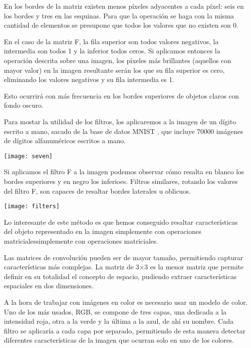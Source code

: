 En los bordes de la matriz existen menos píxeles adyacentes a cada píxel: seis en los bordes y tres en las esquinas. Para que la operación se haga con la misma cantidad de elementos se presupone que todos los valores que no existen son 0.

En el caso de la matriz F, la fila superior son todos valores negativos, la intermedia son todos 1 y la inferior todos ceros. Si aplicamos entonces la operación descrita sobre una imagen, los píxeles más brillantes (aquellos con mayor valor) en la imagen resultante serán los que su fila superior es cero, eliminando los valores negativos y su fila intermedia es 1. 

Esto ocurrirá con más frecuencia en los bordes superiores de objetos claros con fondo oscuro.

Para mostar la utilidad de los filtros, los aplicaremos a la imagen de un dígito escrito a mano, sacado de la base de datos MNIST \parencite{lecun-mnisthandwrittendigit-2010}, que incluye 70000 imágenes de dígitos alfanuméricos escritos a mano.
\begin{center}
  \texttt{[image: seven]}
\end{center}

Si aplicamos el filtro F a la imagen podemos observar cómo resalta en blanco los bordes superiores y en negro los inferioes. Filtros similares, rotando los valores del filtro F, son capaces de resaltar bordes laterales u oblicuos.

\begin{center}
  \texttt{[image: filters]}
\end{center}

Lo interesante de este método es que hemos conseguido resaltar características del objeto representado en la imagen simplemente con operaciones matricialessimplemente con operaciones matriciales.

Las matrices de convolución pueden ser de mayor tamaño, permitiendo capturar características más complejas. La matriz de 3$\times$3 es la menor matriz que permite definir en su totalidad el concepto de espacio, pudiendo extraer características espaciales en dos dimensiones.

A la hora de trabajar con imágenes en color es necesario usar un modelo de color. Uno de los más usados, RGB, se compone de tres capas, una dedicada a la intensidad roja, otra a la verde y la última a la azul, de ahí su nombre. Cada filtro se aplicaría a cada capa por separado, permitiendo de esta manera detectar diferentes características de la imagen que ocurran solo en uno de los colores.

